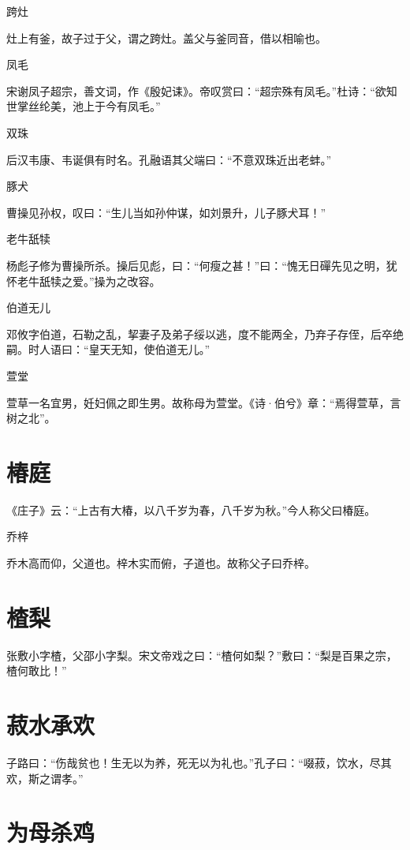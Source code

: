 \documentclass[a4paper,12pt,UTF8,twoside]{ctexbook}
\begin{document}
    跨灶
    
    灶上有釜，故子过于父，谓之跨灶。盖父与釜同音，借以相喻也。
    
    凤毛
    
    宋谢凤子超宗，善文词，作《殷妃诔》。帝叹赏曰：“超宗殊有凤毛。”杜诗：“欲知世掌丝纶美，池上于今有凤毛。”
    
    双珠
    
    后汉韦康、韦诞俱有时名。孔融语其父端曰：“不意双珠近出老蚌。”
    
    豚犬
    
    曹操见孙权，叹曰：“生儿当如孙仲谋，如刘景升，儿子豚犬耳！”
    
    老牛舐犊
    
    杨彪子修为曹操所杀。操后见彪，曰：“何瘦之甚！”曰：“愧无日磾先见之明，犹怀老牛舐犊之爱。”操为之改容。
    
    伯道无儿
    
    邓攸字伯道，石勒之乱，挈妻子及弟子绥以逃，度不能两全，乃弃子存侄，后卒绝嗣。时人语曰：“皇天无知，使伯道无儿。”
    
    萱堂
    
    萱草一名宜男，妊妇佩之即生男。故称母为萱堂。《诗·伯兮》章：“焉得萱草，言树之北”。
    
    \section{椿庭}
    
    《庄子》云：“上古有大椿，以八千岁为春，八千岁为秋。”今人称父曰椿庭。
    
    乔梓
    
    乔木高而仰，父道也。梓木实而俯，子道也。故称父子曰乔梓。
    
    \section{楂梨}
    
    张敷小字楂，父邵小字梨。宋文帝戏之曰：“楂何如梨？”敷曰：“梨是百果之宗，楂何敢比！”
    
    \section{菽水承欢}
    
    子路曰：“伤哉贫也！生无以为养，死无以为礼也。”孔子曰：“啜菽，饮水，尽其欢，斯之谓孝。”
    
    \section{为母杀鸡}
    
\end{document}

